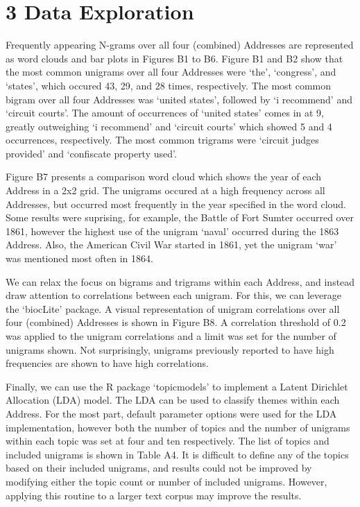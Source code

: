 \documentclass[]{article}
\begin{document}
\section{3 Data Exploration}\label{data-exploration}

Frequently appearing N-grams over all four (combined) Addresses are
represented as word clouds and bar plots in Figures B1 to B6. Figure B1
and B2 show that the most common unigrams over all four Addresses were
`the', `congress', and `states', which occured 43, 29, and 28 times,
respectively. The most common bigram over all four Addresses was `united
states', followed by `i recommend' and `circuit courts'. The amount of
occurrences of `united states' comes in at 9, greatly outweighing `i
recommend' and `circuit courts' which showed 5 and 4 occurrences,
respectively. The most common trigrams were `circuit judges provided'
and `confiscate property used'.

Figure B7 presents a comparison word cloud which shows the year of each
Address in a 2x2 grid. The unigrams occured at a high frequency across
all Addresses, but occurred most frequently in the year specified in the
word cloud. Some results were suprising, for example, the Battle of Fort
Sumter occurred over 1861, however the highest use of the unigram
`naval' occurred during the 1863 Address. Also, the American Civil War
started in 1861, yet the unigram `war' was mentioned most often in 1864.

We can relax the focus on bigrams and trigrams within each Address, and
instead draw attention to correlations between each unigram. For this,
we can leverage the `biocLite' package. A visual representation of
unigram correlations over all four (combined) Addresses is shown in
Figure B8. A correlation threshold of 0.2 was applied to the unigram
correlations and a limit was set for the number of unigrams shown. Not
surprisingly, unigrams previously reported to have high frequencies are
shown to have high correlations.

Finally, we can use the R package `topicmodels' to implement a Latent
Dirichlet Allocation (LDA) model. The LDA can be used to classify themes
within each Address. For the most part, default parameter options were
used for the LDA implementation, however both the number of topics and
the number of unigrams within each topic was set at four and ten
respectively. The list of topics and included unigrams is shown in Table
A4. It is difficult to define any of the topics based on their included
unigrams, and results could not be improved by modifying either the
topic count or number of included unigrams. However, applying this
routine to a larger text corpus may improve the results.
\end{document}
